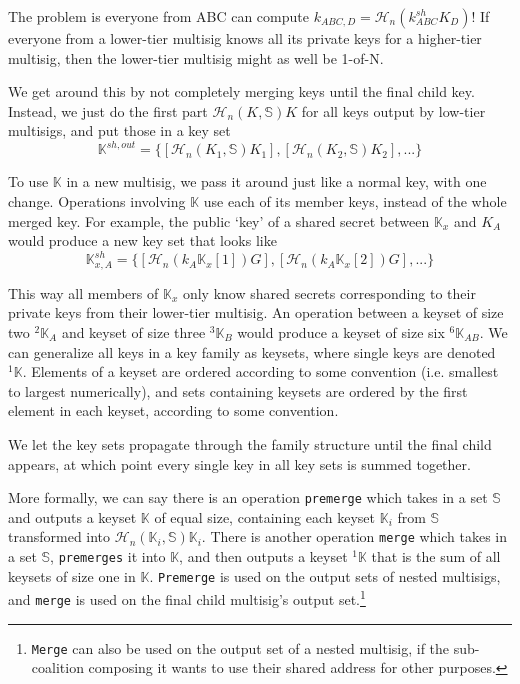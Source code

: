 The problem is everyone from ABC can compute $k_{ABC,D} = \mathcal{H}_n(k^{sh}_{ABC} K_D)$! If everyone from a lower-tier multisig knows all its private keys for a higher-tier multisig, then the lower-tier multisig might as well be 1-of-N.

We get around this by not completely merging keys until the final child key. Instead, we just do the first part $\mathcal{H}_n(K,\mathbb{S}) K$ for all keys output by low-tier multisigs, and put those in a key set
\[ \mathbb{K}^{sh,out} = \{ [\mathcal{H}_n(K_1,\mathbb{S}) K_1], [\mathcal{H}_n(K_2,\mathbb{S}) K_2], ... \} \]

To use $\mathbb{K}$ in a new multisig, we pass it around just like a normal key, with one change. Operations involving $\mathbb{K}$ use each of its member keys, instead of the whole merged key. For example, the public `key' of a shared secret between $\mathbb{K}_x$ and $K_A$ would produce a new key set that looks like
\[ \mathbb{K}^{sh}_{x,A} = \{ [\mathcal{H}_n(k_A \mathbb{K}_x[1]) G], [\mathcal{H}_n(k_A \mathbb{K}_x[2]) G], ...\}\]

This way all members of $\mathbb{K}_x$ only know shared secrets corresponding to their private keys from their lower-tier multisig. An operation between a keyset of size two ${}^{2}\mathbb{K}_A$ and keyset of size three ${}^{3}\mathbb{K}_B$ would produce a keyset of size six ${}^{6}\mathbb{K}_{AB}$. We can generalize all keys in a key family as keysets, where single keys are denoted ${}^{1}\mathbb{K}$. Elements of a keyset are ordered according to some convention (i.e. smallest to largest numerically), and sets containing keysets are ordered by the first element in each keyset, according to some convention.

We let the key sets propagate through the family structure until the final child appears, at which point every single key in all key sets is summed together.

More formally, we can say there is an operation {\tt premerge} which takes in a set $\mathbb{S}$ and outputs a keyset $\mathbb{K}$ of equal size, containing each keyset $\mathbb{K}_i$ from $\mathbb{S}$ transformed into $\mathcal{H}_n(\mathbb{K}_i,\mathbb{S}) \mathbb{K}_i$. There is another operation {\tt merge} which takes in a set $\mathbb{S}$, {\tt premerges} it into $\mathbb{K}$, and then outputs a keyset ${}^{1}\mathbb{K}$ that is the sum of all keysets of size one in $\mathbb{K}$. {\tt Premerge} is used on the output sets of nested multisigs, and {\tt merge} is used on the final child multisig's output set.\footnote{{\tt Merge} can also be used on the output set of a nested multisig, if the sub-coalition composing it wants to use their shared address for other purposes.}

